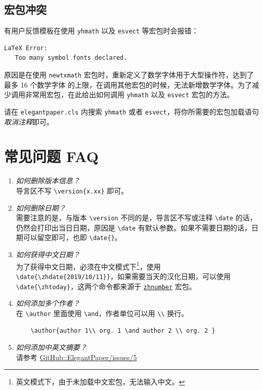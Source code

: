 \documentclass[lang=cn,a4paper]{elegantpaper}
\begin{document}
\subsection{宏包冲突}

有用户反馈模板在使用 \lstinline{yhmath} 以及 \lstinline{esvect} 等宏包时会报错：
\begin{lstlisting}
LaTeX Error:
   Too many symbol fonts declared.
\end{lstlisting}

原因是在使用 \lstinline{newtxmath} 宏包时，重新定义了数学字体用于大型操作符，达到了 {\heiti 最多 16 个数学字体} 的上限，在调用其他宏包的时候，无法新增数学字体。为了减少调用非常用宏包，在此给出如何调用 \lstinline{yhmath} 以及 \lstinline{esvect} 宏包的方法。

请在 \lstinline{elegantpaper.cls} 内搜索 \lstinline{yhmath} 或者 \lstinline{esvect}，将你所需要的宏包加载语句\textit{取消注释}即可。


\section{常见问题 FAQ}

\begin{enumerate}[label=\arabic*).]
  \item \textit{如何删除版本信息？}\\
    导言区不写 \lstinline|\version{x.xx}| 即可。
  \item \textit{如何删除日期？}\\
    需要注意的是，与版本 \lstinline{\version} 不同的是，导言区不写或注释 \lstinline{\date} 的话，仍然会打印出当日日期，原因是 \lstinline{\date} 有默认参数。如果不需要日期的话，日期可以留空即可，也即 \lstinline|\date{}|。
  \item \textit{如何获得中文日期？}\\
    为了获得中文日期，必须在中文模式下\footnote{英文模式下，由于未加载中文宏包，无法输入中文。}，使用 \lstinline|\date{\zhdate{2019/10/11}}|，如果需要当天的汉化日期，可以使用 \lstinline|\date{\zhtoday}|，这两个命令都来源于 \href{https://ctan.org/pkg/zhnumber}{\lstinline{zhnumber}} 宏包。
  \item \textit{如何添加多个作者？}\\
    在 \lstinline{\author} 里面使用 \lstinline{\and}，作者单位可以用 \lstinline{\\} 换行。
    \begin{lstlisting}
    \author{author 1\\ org. 1 \and author 2 \\ org. 2 }
    \end{lstlisting}
  \item \textit{如何添加中英文摘要？}\\
    请参考 \href{https://github.com/ElegantLaTeX/ElegantPaper/issues/5}{GitHub::ElegantPaper/issues/5}
\end{enumerate}
\end{document}
